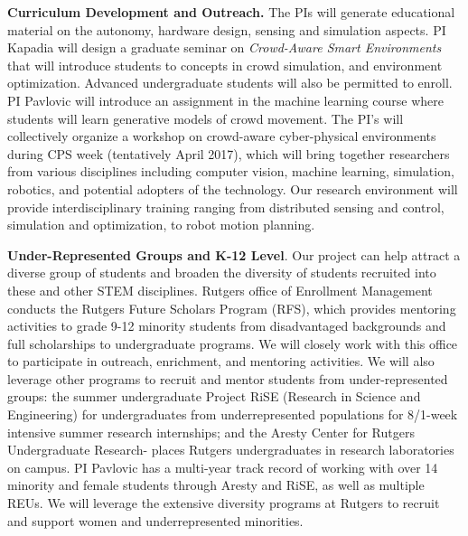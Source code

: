 \noindent \textbf{Curriculum Development and Outreach.} The PIs will generate educational material on the autonomy, hardware design, sensing and simulation aspects. PI Kapadia will design a graduate seminar on \emph{Crowd-Aware Smart Environments} that will introduce students to concepts in crowd simulation, and environment optimization. Advanced undergraduate students will also be permitted to enroll. PI Pavlovic will introduce an assignment in the machine learning course where students will learn generative models of crowd movement. The PI's will collectively organize a workshop on crowd-aware cyber-physical environments during CPS week (tentatively April 2017), which will bring together researchers from various disciplines including computer vision, machine learning, simulation, robotics, and potential adopters of the technology. Our research environment will provide interdisciplinary training ranging from distributed sensing and control, simulation and optimization, to robot motion planning.

\noindent \textbf{Under-Represented Groups and K-12 Level}. Our project can help attract a diverse group of students and broaden the diversity of students recruited into these and other STEM disciplines. Rutgers office of Enrollment Management conducts the Rutgers Future Scholars Program (RFS), which provides mentoring activities to grade 9-12 minority students from disadvantaged backgrounds and full scholarships to undergraduate programs. We will closely work with this office to participate in outreach, enrichment, and mentoring activities. We will also leverage other programs to recruit and mentor students from under-represented groups: the summer undergraduate Project RiSE (Research in Science and Engineering) for undergraduates from underrepresented populations for 8/1-week intensive summer research internships; and the Aresty Center for Rutgers Undergraduate Research- places Rutgers undergraduates in research laboratories on campus. PI Pavlovic has a multi-year track record of working with over 14 minority and female students through Aresty and RiSE, as well as multiple REUs. We will leverage the extensive diversity programs at Rutgers to recruit and support women and underrepresented minorities.

